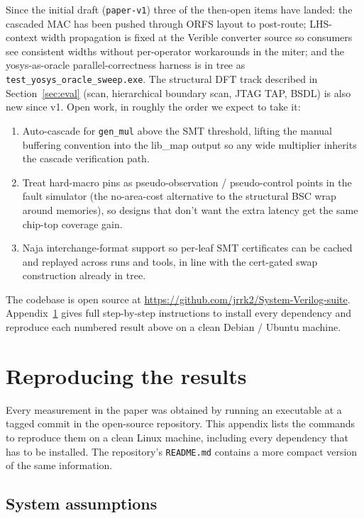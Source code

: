 \documentclass[11pt,a4paper]{article}
\begin{document}
Since the initial draft (\texttt{paper-v1}) three of the
then-open items have landed: the cascaded MAC has been pushed
through ORFS layout to post-route; LHS-context width propagation
is fixed at the Verible converter source so consumers see
consistent widths without per-operator workarounds in the miter;
and the yosys-as-oracle parallel-correctness harness is in tree
as \texttt{test\_yosys\_oracle\_sweep.exe}.  The structural DFT
track described in Section~\ref{sec:eval} (scan, hierarchical
boundary scan, JTAG TAP, BSDL) is also new since v1.  Open work,
in roughly the order we expect to take it:

\begin{enumerate}
\item Auto-cascade for \texttt{gen\_mul} above the SMT
threshold, lifting the manual buffering convention into the
lib\_map output so any wide multiplier inherits the cascade
verification path.
\item Treat hard-macro pins as pseudo-observation / pseudo-control
points in the fault simulator (the no-area-cost alternative to
the structural BSC wrap around memories), so designs that don't
want the extra latency get the same chip-top coverage gain.
\item Naja interchange-format support so per-leaf SMT
certificates can be cached and replayed across runs and tools,
in line with the cert-gated swap construction already in tree.
\end{enumerate}

The codebase is open source at
\url{https://github.com/jrrk2/System-Verilog-suite}.
Appendix~\ref{sec:repro} gives full step-by-step instructions to
install every dependency and reproduce each numbered result above
on a clean Debian / Ubuntu machine.

\appendix

\section{Reproducing the results}
\label{sec:repro}

Every measurement in the paper was obtained by running an
executable at a tagged commit in the open-source repository.  This
appendix lists the commands to reproduce them on a clean Linux
machine, including every dependency that has to be installed.  The
repository's \texttt{README.md} contains a more compact version of
the same information.

\subsection{System assumptions}
\end{document}
